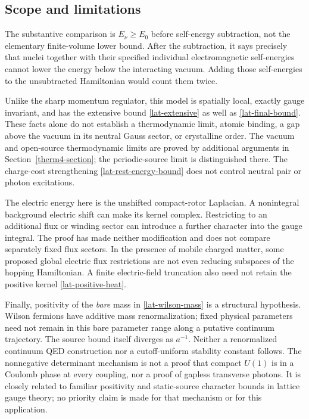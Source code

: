 \subsection{Scope and limitations}

The substantive comparison is $E_\nu\ge E_0$ before self-energy
subtraction, not the elementary finite-volume lower bound.  After the
subtraction, it says precisely that nuclei together with their
specified individual electromagnetic self-energies cannot lower the
energy below the interacting vacuum.  Adding those self-energies to
the unsubtracted Hamiltonian would count them twice.

Unlike the sharp momentum regulator, this model is spatially local,
exactly gauge invariant, and has the extensive bound
\eqref{lat-extensive} as well as \eqref{lat-final-bound}.  These facts
alone do not establish a thermodynamic limit, atomic binding, a gap
above the vacuum in its neutral Gauss sector, or crystalline order.
The vacuum and open-source thermodynamic limits are proved by
additional arguments in Section~\ref{therm4-section}; the periodic-source
limit is distinguished there.
The charge-cost strengthening \eqref{lat-rest-energy-bound} does not
control neutral pair or photon excitations.

The electric energy here is the unshifted compact-rotor Laplacian.
A nonintegral background electric shift can make its kernel complex.
Restricting to an additional flux or winding sector can introduce a
further character into the gauge integral.  The proof has made neither
modification and does not compare separately fixed flux sectors.
In the presence of mobile charged matter, some proposed global electric
flux restrictions are not even reducing subspaces of the hopping
Hamiltonian.  A finite electric-field truncation also need not retain
the positive kernel \eqref{lat-positive-heat}.

Finally, positivity of the \emph{bare} mass in
\eqref{lat-wilson-mass} is a structural hypothesis.  Wilson fermions
have additive mass renormalization; fixed physical parameters need not
remain in this bare parameter range along a putative continuum
trajectory.  The source bound itself diverges as $a^{-1}$.
Neither a renormalized continuum QED construction nor a cutoff-uniform
stability constant follows.  The nonnegative determinant mechanism is
not a proof that compact \(U(1)\) is in a Coulomb phase at every coupling,
nor a proof of gapless transverse photons. It is
closely related to familiar positivity and static-source character
bounds in lattice gauge theory; no priority claim is made for that
mechanism or for this application.
